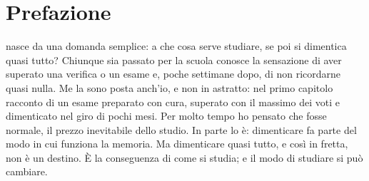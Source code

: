 %
\chapter{Prefazione}

 nasce da una domanda semplice: a che cosa
serve studiare, se poi si dimentica quasi tutto? Chiunque sia passato
per la scuola conosce la sensazione di aver superato una verifica o un
esame e, poche settimane dopo, di non ricordarne quasi nulla. Me la
sono posta anch'io, e non in astratto: nel primo capitolo racconto di
un esame preparato con cura, superato con il massimo dei voti e
dimenticato nel giro di pochi mesi. Per molto tempo ho pensato che
fosse normale, il prezzo inevitabile dello studio. In parte lo è:
dimenticare fa parte del modo in cui funziona la memoria. Ma
dimenticare quasi tutto, e così in fretta, non è un destino. È la
conseguenza di come si studia; e il modo di studiare si può cambiare.

